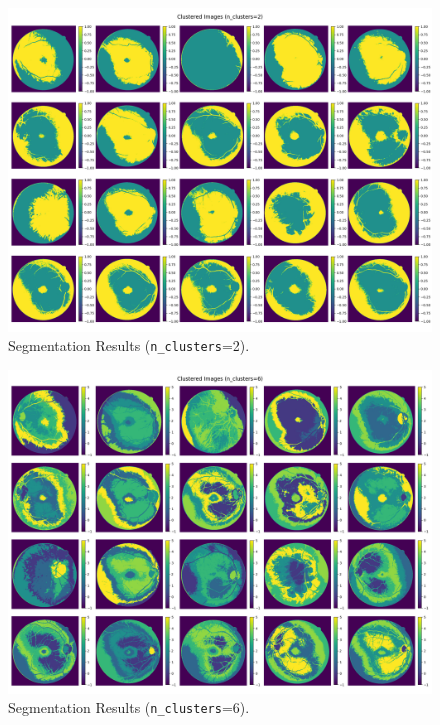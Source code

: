 \documentclass[12pt,letterpaper]{article}
\begin{document}
\begin{figure}[H]
    \centering
    \includegraphics[scale=0.3]{Figures/1-2 2 Clusters.png}
    \vspace{-0.25cm}
    \caption{Segmentation Results (\texttt{n\_clusters}=2).}
    \label{fig:n=2}
\end{figure}
\vspace{-1cm}
\begin{figure}[H]
    \centering
    \includegraphics[scale=0.3]{Figures/1-2 6 Clusters.png}
    \vspace{-0.25cm}
    \caption{Segmentation Results (\texttt{n\_clusters}=6).}
    \label{fig:n=6}
\end{figure}
\end{document}
